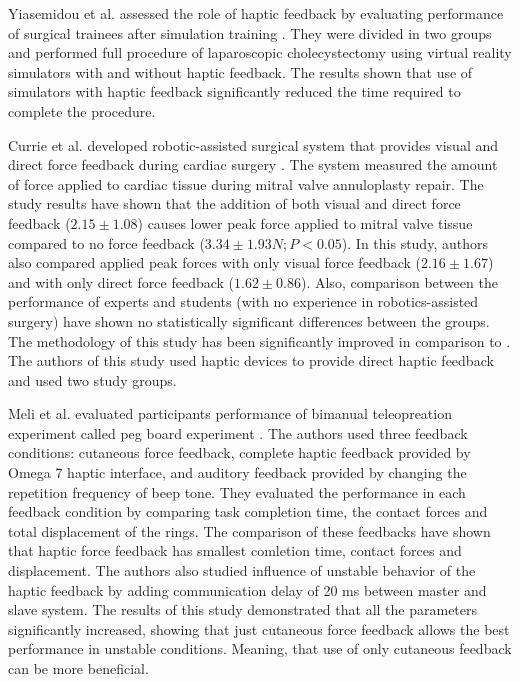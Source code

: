 Yiasemidou et al. assessed the role of haptic feedback by evaluating performance of surgical trainees after simulation training \cite{yiasemidou_faster_2011}. They were divided in two groups and performed full procedure of laparoscopic cholecystectomy using virtual reality simulators with and without haptic feedback.  The results shown that use of simulators with haptic feedback significantly reduced the time required to complete the procedure.

Currie et al. developed robotic-assisted surgical system that provides visual and direct force feedback during cardiac surgery \cite{currie_role_2017}. The system measured the amount of force applied to cardiac tissue during mitral valve annuloplasty repair. The study results have shown that the addition of both visual and direct force feedback ($2.15 \pm 1.08$) causes lower peak force applied to mitral valve tissue compared to no force feedback ($3.34 \pm 1.93 N; P < 0.05$). In this study, authors also compared applied peak forces with only visual force feedback ($2.16 \pm 1.67$) and with only direct force feedback ($1.62 \pm 0.86$). Also, comparison between the performance of experts and students (with no experience in robotics-assisted surgery) have shown no statistically significant differences between the groups. The methodology of this study has been significantly improved in comparison to \cite{bethea_application_2004}. The authors of this study\cite{currie_role_2017} used haptic devices to provide direct haptic feedback and used two study groups.

Meli et al. evaluated participants performance of bimanual teleopreation experiment called peg board experiment \cite{pacchierotti_2016}. The authors used three feedback conditions: cutaneous force feedback, complete haptic feedback provided by Omega 7 haptic interface, and auditory feedback provided by changing the repetition frequency of beep tone. They evaluated the performance in each feedback condition by comparing task completion time, the contact forces and total displacement of the rings. The comparison of these feedbacks have shown that haptic force feedback has smallest comletion time, contact forces and displacement. The authors also studied influence of unstable behavior of the haptic feedback by adding communication delay of 20 ms between master and slave system. The results of this study demonstrated that all the parameters significantly increased, showing that just cutaneous force feedback allows the best performance in unstable conditions. Meaning, that use of only cutaneous feedback can be more beneficial.

